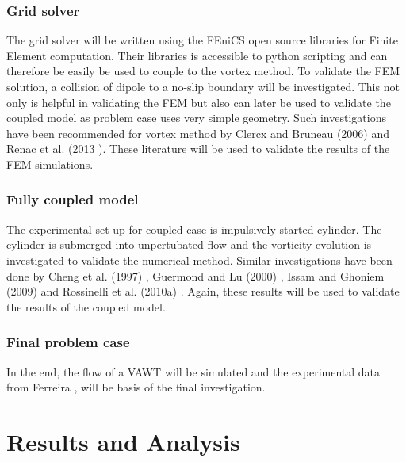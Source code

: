 \subsubsection*{Grid solver}
The grid solver will be written using the FEniCS open source libraries for Finite Element computation. Their libraries is accessible to python scripting and can therefore be easily be used to couple to the vortex method. To validate the FEM solution, a collision of dipole to a no-slip boundary will be investigated. This not only is helpful in validating the FEM but also can later be used to validate the coupled model as problem case uses very simple geometry. Such investigations have been recommended for vortex method by Clercx and Bruneau (2006) \cite{Clercx2006} and Renac et al. (2013 )\cite{Renac2013}. These literature will be used to validate the results of the FEM simulations.\\

\subsubsection*{Fully coupled model}
The experimental set-up for coupled case is impulsively started cylinder. The cylinder is submerged into unpertubated flow and the vorticity evolution is investigated to validate the numerical method. Similar investigations have been done by Cheng et al. (1997) \cite{Cheng1997}, Guermond and Lu (2000) \cite{Guermond2000}, Issam and Ghoniem (2009) \cite{Lakkis2009} and Rossinelli et al. (2010a) \cite{Rossinelli2010a}. Again, these results will be used to validate the results of the coupled model.\\

\subsubsection*{Final problem case}
In the end, the flow of a VAWT will be simulated and the experimental data from Ferreira \cite{Ferreira} \cite{Ferreira2007} \cite{SimaoFerreira2008}, will be basis of the final investigation.\\

\section{Results and Analysis}
\label{sec:objective}


